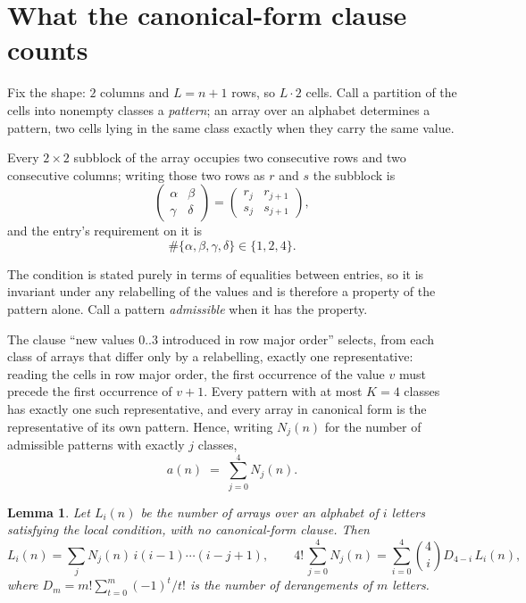 \documentclass[11pt,a4paper]{article}
\theoremstyle{plain}
\newtheorem{lemma}[theorem]{Lemma}
\theoremstyle{definition}
\begin{document}
\section{What the canonical-form clause counts}

Fix the shape: $2$ columns and $L=n+1$ rows, so $L\cdot2$ cells. Call a
partition of the cells into nonempty classes a \emph{pattern}; an array over an alphabet
determines a pattern, two cells lying in the same class exactly when they carry the same
value.

Every $2\times2$ subblock of the array occupies two consecutive
rows and two consecutive columns; writing those two rows as $r$ and $s$ the
subblock is
\[
\begin{pmatrix}\alpha&\beta\\\gamma&\delta\end{pmatrix}=\begin{pmatrix}r_j&r_{j+1}\\s_j&s_{j+1}\end{pmatrix},
\]
and the entry's requirement on it is
\begin{equation}\label{eq:loc}
\#\{\alpha,\beta,\gamma,\delta\}\in\{1,2,4\}.
\end{equation}

The condition is stated purely in terms of equalities between entries, so it is invariant
under any relabelling of the values and is therefore a property of the pattern alone. Call a
pattern \emph{admissible} when it has the property.

The clause ``new values $0..3$ introduced in row major order'' selects, from each class
of arrays that differ only by a relabelling, exactly one representative: reading the cells in
row major order, the first occurrence of the value $v$ must precede the first occurrence of
$v+1$. Every pattern with at most $K=4$ classes has exactly one such representative, and
every array in canonical form is the representative of its own pattern. Hence, writing
$N_j(n)$ for the number of admissible patterns with exactly $j$ classes,
\begin{equation}\label{eq:apat}
a(n)\;=\;\sum_{j=0}^{4}N_j(n).
\end{equation}

\begin{lemma}\label{lem:inv}
Let $L_i(n)$ be the number of arrays over an alphabet of $i$ letters satisfying the local
condition, with no canonical-form clause. Then
\[
L_i(n)=\sum_j N_j(n)\,i(i-1)\cdots(i-j+1),
\qquad
4!\,\sum_{j=0}^{4}N_j(n)=\sum_{i=0}^{4}\binom{4}{i}D_{4-i}\,L_i(n),
\]
where $D_m=m!\sum_{t=0}^{m}(-1)^t/t!$ is the number of derangements of $m$ letters.
\end{lemma}
\end{document}

